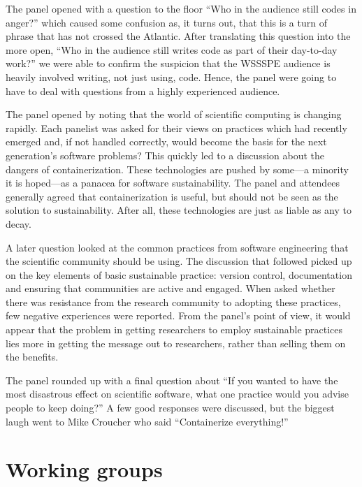 \documentclass[11pt, oneside]{amsart}
\begin{document}
The panel opened with a question to the floor ``Who in the audience still codes in anger?'' which caused some confusion as, it turns out, that this is a turn of phrase that has not crossed the Atlantic.
After translating this question into the more open, ``Who in the audience still writes code as part of their day-to-day work?'' we were able to confirm the suspicion that the WSSSPE audience is heavily involved writing, not just using, code.
Hence, the panel were going to have to deal with questions from a highly experienced audience.

The panel opened by noting that the world of scientific computing is changing rapidly.
Each panelist was asked for their views on practices which had recently emerged and, if not handled correctly, would become the basis for the next generation's software problems?
This quickly led to a discussion about the dangers of containerization.
These technologies are pushed by some---a minority it is hoped---as a panacea for software sustainability.
The panel and attendees generally agreed that containerization is useful, but should not be seen as the solution to sustainability.
After all, these technologies are just as liable as any to decay.

A later question looked at the common practices from software engineering that the scientific community should be using.
The discussion that followed picked up on the key elements of basic sustainable practice: version control, documentation and ensuring that communities are active and engaged.
When asked whether there was resistance from the research community to adopting these practices, few negative experiences were reported.
From the panel's point of view, it would appear that the problem in getting researchers to employ sustainable practices lies more in getting the message out to researchers, rather than selling them on the benefits.

The panel rounded up with a final question about ``If you wanted to have the most disastrous effect on scientific software, what one practice would you advise people to keep doing?''
A few good responses were discussed, but the biggest laugh went to Mike Croucher who said ``Containerize everything!''


\section{Working groups} \label{sec:WGs}
\end{document}
